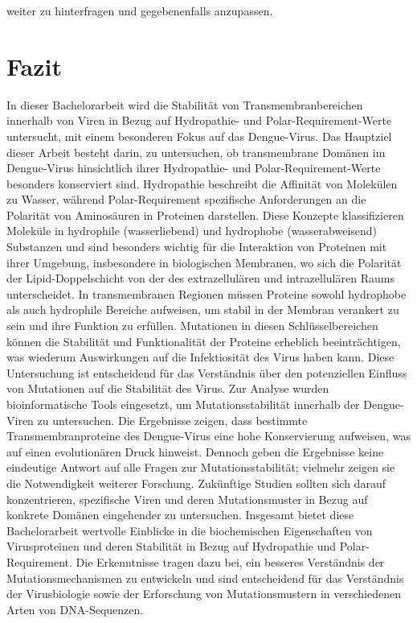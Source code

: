 \documentclass[german,version-2022-01]{uzl-thesis}
\begin{document}
weiter zu hinterfragen und gegebenenfalls anzupassen.

\chapter{Fazit}


%

In dieser Bachelorarbeit wird die Stabilit\"at von Transmembranbereichen innerhalb von Viren in Bezug auf Hydropathie- und Polar-Requirement-Werte untersucht, mit einem besonderen Fokus auf das Dengue-Virus. Das Hauptziel dieser Arbeit besteht darin, zu untersuchen, ob transmembrane Dom\"anen im Dengue-Virus hinsichtlich ihrer Hydropathie- und Polar-Requirement-Werte besonders konserviert sind. Hydropathie beschreibt die Affinit\"at von Molek\"ulen zu Wasser, w\"ahrend Polar-Requirement spezifische Anforderungen an die Polarit\"at von Aminos\"auren in Proteinen darstellen. Diese Konzepte klassifizieren Molek\"ule in hydrophile (wasserliebend) und hydrophobe (wasserabweisend) Substanzen und sind besonders wichtig f\"ur die Interaktion von Proteinen mit ihrer Umgebung, insbesondere in biologischen Membranen, wo sich die Polarit\"at der Lipid-Doppelschicht von der des extrazellul\"aren und intrazellul\"aren Raums unterscheidet. In transmembranen Regionen m\"ussen Proteine sowohl hydrophobe als auch hydrophile Bereiche aufweisen, um stabil in der Membran verankert zu sein und ihre Funktion zu erf\"ullen. Mutationen in diesen Schl\"usselbereichen k\"onnen die Stabilit\"at und Funktionalit\"at der Proteine erheblich beeintr\"achtigen, was wiederum Auswirkungen auf die Infektiosit\"at des Virus haben kann. Diese Untersuchung ist entscheidend f\"ur das Verst\"andnis \"uber den potenziellen Einfluss von Mutationen auf die Stabilit\"at des Virus. Zur Analyse wurden bioinformatische Tools eingesetzt, um Mutationsstabilit\"at innerhalb der Dengue-Viren zu untersuchen. Die Ergebnisse zeigen, dass bestimmte Transmembranproteine des Dengue-Virus eine hohe Konservierung aufweisen, was auf einen evolution\"aren Druck hinweist. Dennoch geben die Ergebnisse keine eindeutige Antwort auf alle Fragen zur Mutationsstabilit\"at; vielmehr zeigen sie die Notwendigkeit weiterer Forschung. Zuk\"unftige Studien sollten sich darauf konzentrieren, spezifische Viren und deren Mutationsmuster in Bezug auf konkrete Dom\"anen eingehender zu untersuchen. Insgesamt bietet diese Bachelorarbeit wertvolle Einblicke in die biochemischen Eigenschaften von Virusproteinen und deren Stabilit\"at in Bezug auf Hydropathie und Polar-Requirement. Die Erkenntnisse tragen dazu bei, ein besseres Verst\"andnis der Mutationsmechanismen zu entwickeln und sind entscheidend f\"ur das Verst\"andnis der Virusbiologie sowie der Erforschung von Mutationsmustern in verschiedenen Arten von DNA-Sequenzen.
\end{document}
